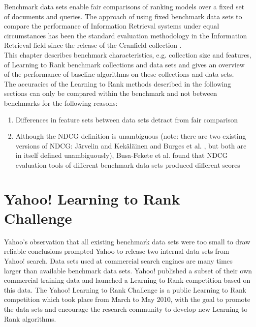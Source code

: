 \label{chap:benchmark_results}
Benchmark data sets enable fair comparisons of ranking models over a fixed set of documents and queries. The approach of using fixed benchmark data sets to compare the performance of Information Retrieval systems under equal circumstances has been the standard evaluation methodology in the Information Retrieval field since the release of the Cranfield collection \cite{Cleverdon1966}.\\

This chapter describes benchmark characteristics, e.g. collection size and features, of Learning to Rank benchmark collections and data sets and gives an overview of the performance of baseline algorithms on these collections and data sets.\\

The accuracies of the Learning to Rank methods described in the following sections can only be compared within the benchmark and not between benchmarks for the following reasons:
\begin{enumerate}
\item Differences in feature sets between data sets detract from fair comparison
\item Although the \ac{NDCG} definition is unambiguous (note: there are two existing versions of \ac{NDCG}: J{\"a}rvelin and Kek{\"a}l{\"a}inen \cite{Jarvelin2002} and Burges et al. \cite{Burges2005}, but both are in itself defined unambiguously), Busa-Fekete et al. \cite{Busa-Fekete2012} found that \ac{NDCG} evaluation tools of different benchmark data sets produced different scores
\end{enumerate}

\section{Yahoo! Learning to Rank Challenge}
Yahoo's observation that all existing benchmark data sets were too small to draw reliable conclusions prompted Yahoo to release two internal data sets from Yahoo! search. Data sets used at commercial search engines are many times larger than available benchmark data sets. Yahoo! published a subset of their own commercial training data and launched a Learning to Rank competition based on this data. The Yahoo! Learning to Rank Challenge \cite{Chapelle2011a} is a public Learning to Rank competition which took place from March to May 2010, with the goal to promote the data sets and encourage the research community to develop new Learning to Rank algorithms.\\

